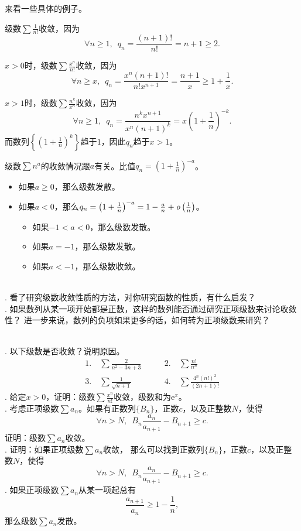 \documentclass[12pt,UTF8]{ctexbook}
\begin{document}
来看一些具体的例子。

级数$\sum \frac{1}{n!}$收敛，因为
$$\forall n \geqslant 1,  \,\,\,q_n = \frac{(n+1)!}{n!} = n+1 \geqslant 2. $$

$x>0$时，级数$\sum \frac{x^n}{n!}$收敛，因为
$$\forall n \geqslant x,  \,\,\,q_n = \frac{x^n (n+1)!}{n! x^{n+1}} = \frac{n+1}{x} \geqslant 1 + \frac{1}{x}. $$

$x>1$时，级数$\sum \frac{n^k}{x^n}$收敛，因为
$$\forall n \geqslant 1,  \,\,\,q_n = \frac{n^k x^{n+1}}{x^n (n+1)^{k}} = x\left(1 + \frac{1}{n}\right)^{-k}. $$
而数列$\left\{\left(1 + \frac{1}{n}\right)^k\right\}$趋于$1$，因此$q_n$趋于$x>1$。

级数$\sum n^a$的收敛情况跟$a$有关。比值$q_n = \left(1 + \frac{1}{n}\right)^{-a}$。
\begin{itemize}
    \item 如果$a\geqslant 0$，那么级数发散。
    \item 如果$a<0$，那么$q_n = \left(1 + \frac{1}{n}\right)^{-a} = 1 - \frac{a}{n} + \mathit{o}\left(\frac{1}{n}\right)$。
    \begin{itemize}
        \item 如果$-1 < a < 0$，那么级数发散。
        \item 如果$a = -1$，那么级数发散。
        \item 如果$a < -1$，那么级数收敛。
    \end{itemize}
\end{itemize}

\begin{sk}
    \mbox{} \\
    . 看了研究级数收敛性质的方法，对你研究函数的性质，有什么启发？\\
    . 如果数列从某一项开始都是正数，这样的数列能否通过研究正项级数来讨论收敛性？
    进一步来说，数列的负项如果更多的话，如何转为正项级数来研究？
\end{sk}

\begin{xt}
    \mbox{} \\
    . 以下级数是否收敛？说明原因。
    $$
    \begin{array}{ll}
        1. \quad \sum \frac{2}{n^2 - 3n + 3} \qquad &2. \quad \sum \frac{n!}{n^n} \\
        3. \quad \sum \frac{1}{\sqrt{n + 1}} \qquad &4. \quad \sum \frac{4^n (n!)^2}{(2n + 1)!} 
    \end{array}
    $$
    . 给定$x>0$，证明：级数$\sum \frac{x^n}{n!}$收敛，级数和为$\mathrm{e}^x$。\\
    . 考虑正项级数$\sum a_n$。如果有正数列$\{B_n\}$，正数$c$，以及正整数$N$，使得
    $$ \forall n > N, \,\,\, B_n \frac{a_n}{a_{n+1}} - B_{n+1} \geqslant c. $$
    证明：级数$\sum a_n$收敛。\\
    . 证明：如果正项级数$\sum a_n$收敛，
    那么可以找到正数列$\{B_n\}$，正数$c$，以及正整数$N$，使得
    $$ \forall n > N, \,\,\, B_n \frac{a_n}{a_{n+1}} - B_{n+1} \geqslant c. $$
    . 如果正项级数$\sum a_n$从某一项起总有
    $$ \frac{a_{n+1}}{a_n} \geqslant 1 - \frac{1}{n},$$
    那么级数$\sum a_n$发散。\\

\end{xt}
\end{document}
